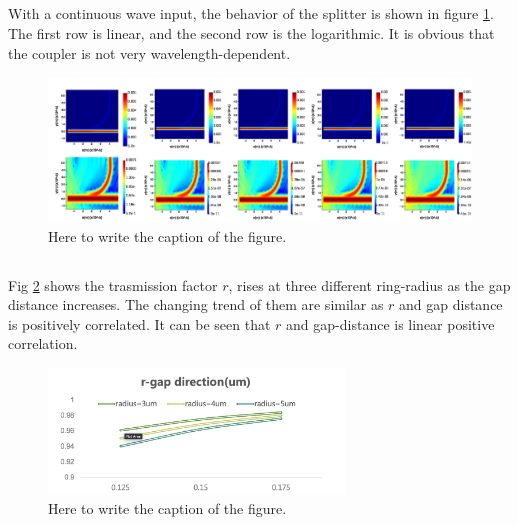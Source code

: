 \documentclass[fontsize=11pt]{scrartcl}
\begin{document}
\subsection{}
With a continuous wave input,
the behavior of the splitter is shown in figure \ref{fig2.2}.
The first row is linear,
and the second row is the logarithmic.
It is obvious that the coupler is not very wavelength-dependent.
\begin{figure}[H]
    \centering
     \includegraphics[width=1\textwidth]{img/fig2.2.png}
     \caption{Here to write the caption of the figure.}
     \label{fig2.2}
\end{figure} 
\subsection{}
Fig \ref{fig2.3} shows the trasmission factor $r$, rises at three different ring-radius 
as the gap distance increases. The changing trend of them are similar 
as $r$ and gap distance is positively correlated. It can be seen that 
$r$ and gap-distance is linear positive correlation.
\begin{figure}[H]
    \centering
     \includegraphics[width=0.7\textwidth]{img/fig2.3.png}
     \caption{Here to write the caption of the figure.}
     \label{fig2.3}
\end{figure} 
\pagebreak
\end{document}
